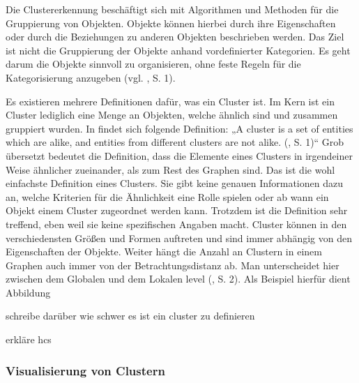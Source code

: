Die Clustererkennung beschäftigt sich mit Algorithmen und Methoden für die Gruppierung von Objekten. Objekte können hierbei durch ihre Eigenschaften oder durch die Beziehungen zu anderen Objekten beschrieben werden. Das Ziel ist nicht die Gruppierung der Objekte anhand vordefinierter Kategorien. Es geht darum die Objekte sinnvoll zu organisieren, ohne feste Regeln für die Kategorisierung anzugeben (vgl. \cite{clustering:AlgosForClust}, S. 1). 

Es existieren mehrere Definitionen dafür, was ein Cluster ist. Im Kern ist ein Cluster lediglich eine Menge an Objekten, welche ähnlich sind und zusammen gruppiert wurden. In  findet sich folgende Definition: „A cluster is a set of entities which are alike, and entities from different clusters are not alike. (\cite{clustering:AlgosForClust}, S. 1)“ Grob übersetzt bedeutet die Definition, dass die Elemente eines Clusters in irgendeiner Weise ähnlicher zueinander, als zum Rest des Graphen sind. Das ist die wohl einfachste Definition eines Clusters. Sie gibt keine genauen Informationen dazu an, welche Kriterien für die Ähnlichkeit eine Rolle spielen oder ab wann ein Objekt einem Cluster zugeordnet werden kann. Trotzdem ist die Definition sehr treffend, eben weil sie keine spezifischen Angaben macht. Cluster können in den verschiedensten Größen und Formen auftreten und sind immer abhängig von den Eigenschaften der Objekte. Weiter hängt die Anzahl an Clustern in einem Graphen auch immer von der Betrachtungsdistanz ab. Man unterscheidet hier zwischen dem Globalen und dem Lokalen level (\cite{clustering:AlgosForClust}, S. 2). Als Beispiel hierfür dient Abbildung 

schreibe darüber wie schwer es ist ein cluster zu definieren

erkläre hcs


\subsubsection{Visualisierung von Clustern}
